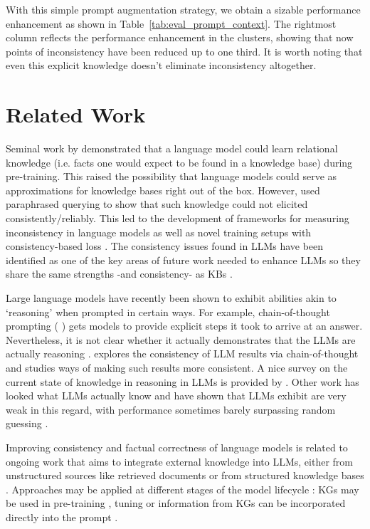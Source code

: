 \documentclass{article} %
\begin{document}
With this simple prompt augmentation strategy, we obtain a sizable performance enhancement as shown in Table~\ref{tab:eval_prompt_context}. The rightmost column reflects the performance enhancement in the clusters, showing that now points of inconsistency have been reduced up to one third. It is worth noting that even this explicit knowledge doesn't eliminate inconsistency altogether.  

\section{Related Work}
\label{sec:rel_work}

Seminal work by \cite{petroni2019language} demonstrated that a language model could learn relational knowledge (i.e. facts one would expect to be found in a knowledge base) during pre-training. This raised the possibility that language models could serve as approximations for knowledge bases right out of the box. However, \cite{elazar2021measuring} used paraphrased querying to show that such knowledge could not elicited consistently/reliably. This led to the development of frameworks for measuring inconsistency in language models \citep{jang2021accurate, laban2023llms, sahu2022unpacking} as well as novel training setups with consistency-based loss \citep{elazar2021measuring}. The consistency issues found in LLMs have been identified as one of the key areas of future work needed to enhance LLMs so they share the same strengths -and consistency- as KBs \citep{alkhamissi2022review}.

Large language models have recently been shown to exhibit abilities akin to `reasoning' when prompted in certain ways. For example, chain-of-thought prompting ( \cite{wei2022emergent}) gets models to provide explicit steps it took to arrive at an answer. Nevertheless, it is not clear whether it actually demonstrates that the LLMs are actually reasoning \cite{ wei2022emergent, kojima2023large}. \cite{wang2023selfconsistency} explores the consistency of LLM results via chain-of-thought and studies ways of making such results more consistent. A nice survey on the current state of knowledge in reasoning in LLMs is provided by \cite{ huang2023reasoning}. Other work has looked what LLMs actually know \cite {yin2023large, srivastava2023imitation, sun2023headtotail} and have shown that LLMs exhibit are very weak in this regard, with performance sometimes barely surpassing random guessing \cite{srivastava2023imitation}.

Improving consistency and factual correctness of language models is related to ongoing work that aims to integrate external knowledge into LLMs, either from unstructured sources like retrieved documents or from structured knowledge bases \citep{feng2023trends,yang2024facts}. Approaches may be applied at different stages of the model lifecycle \citep{Pan_2024}: KGs may be used in pre-training \citep{yasunaga2022deep}, tuning \citep{zhang2024knowledge, cheng2023editing} or information from KGs can be incorporated directly into the prompt \citep{Andrus_Nasiri_Cui_Cullen_Fulda_2022, fatemi2024talk}. 
\end{document}
